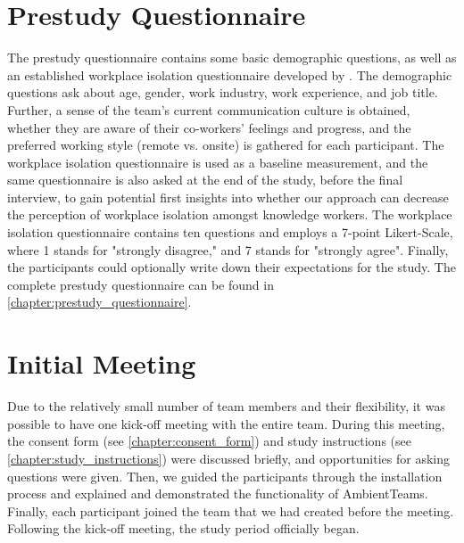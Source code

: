 \section{Prestudy Questionnaire}
\label{section:prestudy_questionnaire}
The prestudy questionnaire contains some basic demographic questions, as well as an established workplace isolation questionnaire developed by \textcite{marshall2007workplace}. The demographic questions ask about age, gender, work industry, work experience, and job title. Further, a sense of the team's current communication culture is obtained, whether they are aware of their co-workers' feelings and progress, and the preferred working style (remote vs. onsite) is gathered for each participant. The workplace isolation questionnaire is used as a baseline measurement, and the same questionnaire is also asked at the end of the study, before the final interview, to gain potential first insights into whether our approach can decrease the perception of workplace isolation amongst knowledge workers. The workplace isolation questionnaire contains ten questions and employs a 7-point Likert-Scale, where 1 stands for "strongly disagree," and 7 stands for "strongly agree". Finally, the participants could optionally write down their expectations for the study. The complete prestudy questionnaire can be found in \autoref{chapter:prestudy_questionnaire}.

\section{Initial Meeting}
\label{section:initial_meeting}
Due to the relatively small number of team members and their flexibility, it was possible to have one kick-off meeting with the entire team. During this meeting, the consent form (see \autoref{chapter:consent_form}) and study instructions (see \autoref{chapter:study_instructions}) were discussed briefly, and opportunities for asking questions were given. Then, we guided the participants through the installation process and explained and demonstrated the functionality of AmbientTeams. Finally, each participant joined the team that we had created before the meeting. Following the kick-off meeting, the study period officially began.

